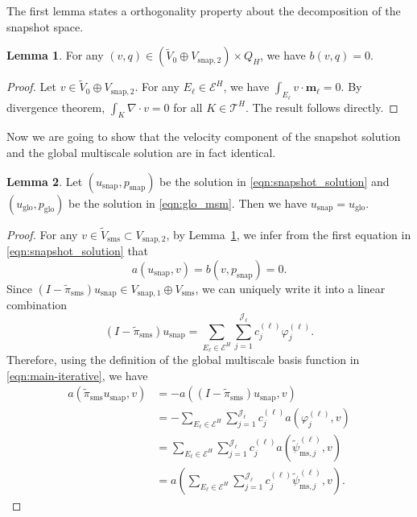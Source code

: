 \documentclass{article}[11pt]
\theoremstyle{definition}
\newtheorem{lemma}{Lemma}[section]
\begin{document}
The first lemma states a orthogonality property about the decomposition of the snapshot space. 
\begin{lemma}\label{lemma:ortho-1}
For any $(v,q) \in (\tilde{V}_0 \oplus V_{\text{snap},2}) \times Q_H$, we have $b(v,q) = 0$.
\begin{proof}
Let $v \in \tilde{V}_0 \oplus V_{\text{snap},2}$. For any $E_\ell \in \mathcal{E}^H$, we have 
$\int_{E_{\ell}}v \cdot \textbf{m}_{{\ell}}=0$. By divergence theorem, $\int_K \nabla\cdot v=0$ for all $K \in \mathcal{T}^H$. The result follows directly. 
\end{proof}
\end{lemma}

Now we are going to show that the velocity component of the snapshot solution and the global multiscale solution are in fact identical. 
\begin{lemma}\label{lemma:snap-glo}
Let $(u_{\text{snap}},p_{\text{snap}})$ be the solution in \eqref{eqn:snapshot_solution} 
and $(u_{\text{glo}},p_{\text{glo}})$ be the solution in \eqref{eqn:glo_msm}. 
Then we have $u_{\text{snap}} = u_{\text{glo}}$. 
\begin{proof}
For any $v\in\tilde{V}_{\text{sms}}\subset V_{\text{snap},2}$, by Lemma~\ref{lemma:ortho-1}, we infer from the first equation in \eqref{eqn:snapshot_solution} that 
\begin{equation}
a(u_{\text{snap}}, v) = b(v, p_{\text{snap}}) = 0.
\end{equation}
Since $(I - \tilde{\pi}_{\text{sms}})u_{\text{snap}} \in V_{\text{snap},1} \oplus V_{\text{sms}}$, we can uniquely write it into a linear combination
\[
(I - \tilde{\pi}_{\text{sms}})u_{\text{snap}} = 
\sum_{E_\ell \in \mathcal{E}^H} \sum_{j=1}^{\mathcal{J}_\ell} 
c_{j}^{(\ell)} \varphi_{j}^{(\ell)}.
\]
Therefore, using the definition of the global multiscale basis function in \eqref{eqn:main-iterative}, we have 
\[
\begin{split}
a(\tilde{\pi}_{\text{sms}} u_{\text{snap}}, v)
& = -a((I - \tilde{\pi}_{\text{sms}})u_{\text{snap}}, v) \\
& = -\sum_{E_\ell \in \mathcal{E}^H} \sum_{j=1}^{\mathcal{J}_\ell} 
c_{j}^{(\ell)} a(\varphi_{j}^{(\ell)}, v) \\
& = \sum_{E_\ell \in \mathcal{E}^H} \sum_{j=1}^{\mathcal{J}_\ell} 
c_{j}^{(\ell)} a\left (\tilde \psi_{\text{ms},j}^{(\ell)}, v \right) \\
& = a\left (\sum_{E_\ell \in \mathcal{E}^H} \sum_{j=1}^{\mathcal{J}_\ell} 
c_{j}^{(\ell)} \tilde \psi_{\text{ms},j}^{(\ell)}, v \right). 

\end{split}\]
\end{proof}
\end{lemma}
\end{document}

